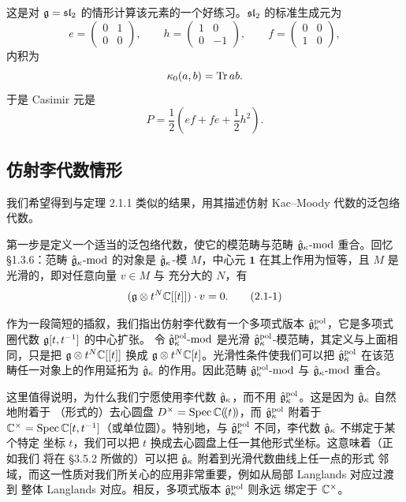 这是对 $\mathfrak{g}=\mathfrak{sl}_2$ 的情形计算该元素的一个好练习。$\mathfrak{sl}_2$ 的标准生成元为
\[
    e=\begin{pmatrix}0&1\\0&0\end{pmatrix},\qquad
    h=\begin{pmatrix}1&0\\0&-1\end{pmatrix},\qquad
    f=\begin{pmatrix}0&0\\1&0\end{pmatrix},
\]
内积为
\[
    \kappa_0(a,b)=\operatorname{Tr} ab.
\]
于是 Casimir 元是
\[
    P=\frac12\left(ef+fe+\frac12h^2\right).
\]

\subsection{仿射李代数情形}

我们希望得到与定理 2.1.1 类似的结果，用其描述仿射 Kac--Moody 代数的泛包络
代数。

第一步是定义一个适当的泛包络代数，使它的模范畴与范畴
$\hat{\mathfrak{g}}_\kappa\text{-}\mathrm{mod}$ 重合。回忆 \S1.3.6：范畴
$\hat{\mathfrak{g}}_\kappa\text{-}\mathrm{mod}$ 的对象是 $\hat{\mathfrak{g}}_\kappa$-模 $M$，中心元
$\mathbf{1}$ 在其上作用为恒等，且 $M$ 是光滑的，即对任意向量 $v\in M$ 与
充分大的 $N$，有
\begin{equation}
    (\mathfrak{g}\otimes t^N\mathbb{C}[[t]])\cdot v=0.
    \tag{2.1-1}
\end{equation}

作为一段简短的插叙，我们指出仿射李代数有一个多项式版本
$\hat{\mathfrak{g}}^{\mathrm{pol}}_\kappa$，它是多项式圈代数 $\mathfrak{g}[t,t^{-1}]$ 的中心扩张。
令 $\hat{\mathfrak{g}}^{\mathrm{pol}}_\kappa\text{-}\mathrm{mod}$ 是光滑
$\hat{\mathfrak{g}}^{\mathrm{pol}}_\kappa$-模范畴，其定义与上面相同，只是把
$\mathfrak{g}\otimes t^N\mathbb{C}[[t]]$ 换成 $\mathfrak{g}\otimes t^N\mathbb{C}[t]$。光滑性条件使我们可以把
$\hat{\mathfrak{g}}^{\mathrm{pol}}_\kappa$ 在该范畴任一对象上的作用延拓为
$\hat{\mathfrak{g}}_\kappa$ 的作用。因此范畴 $\hat{\mathfrak{g}}^{\mathrm{pol}}_\kappa\text{-}\mathrm{mod}$
与 $\hat{\mathfrak{g}}_\kappa\text{-}\mathrm{mod}$ 重合。

这里值得说明，为什么我们宁愿使用李代数 $\hat{\mathfrak{g}}_\kappa$，而不用
$\hat{\mathfrak{g}}^{\mathrm{pol}}_\kappa$。这是因为 $\hat{\mathfrak{g}}_\kappa$ 自然地附着于
（形式的）去心圆盘 $D^\times=\operatorname{Spec}\mathbb{C}(\!(t)\!)$，而
$\hat{\mathfrak{g}}^{\mathrm{pol}}_\kappa$ 附着于
$\mathbb{C}^\times=\operatorname{Spec}\mathbb{C}[t,t^{-1}]$（或单位圆）。特别地，与
$\hat{\mathfrak{g}}^{\mathrm{pol}}_\kappa$ 不同，李代数 $\hat{\mathfrak{g}}_\kappa$ 不绑定于某个特定
坐标 $t$，我们可以把 $t$ 换成去心圆盘上任一其他形式坐标。这意味着（正如我们
将在 \S3.5.2 所做的）可以把 $\hat{\mathfrak{g}}_\kappa$ 附着到光滑代数曲线上任一点的形式
邻域，而这一性质对我们所关心的应用非常重要，例如从局部 Langlands 对应过渡到
整体 Langlands 对应。相反，多项式版本 $\hat{\mathfrak{g}}^{\mathrm{pol}}_\kappa$ 则永远
绑定于 $\mathbb{C}^\times$。

